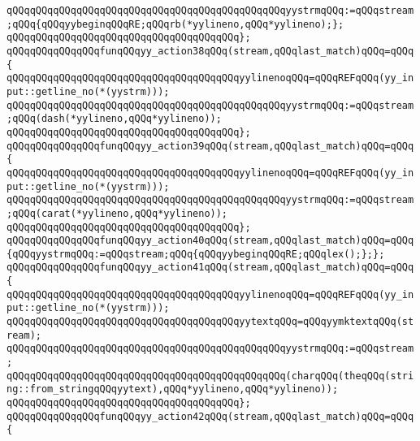 \verb|qQQqqQQqqQQqqQQqqQQqqQQqqQQqqQQqqQQqqQQqqQQqqQQqyystrmqQQq:=qQQqstream;qQQq{qQQqyybeginqQQqRE;qQQqrb(*yylineno,qQQq*yylineno);};|\newline
\verb|qQQqqQQqqQQqqQQqqQQqqQQqqQQqqQQqqQQqqQQq};|\newline
\verb|qQQqqQQqqQQqqQQqfunqQQqyy_action38qQQq(stream,qQQqlast_match)qQQq=qQQq{|\newline
\verb|qQQqqQQqqQQqqQQqqQQqqQQqqQQqqQQqqQQqqQQqyylinenoqQQq=qQQqREFqQQq(yy_input::getline_no(*(yystrm)));|\newline
\newline
\verb|qQQqqQQqqQQqqQQqqQQqqQQqqQQqqQQqqQQqqQQqqQQqqQQqyystrmqQQq:=qQQqstream;qQQq(dash(*yylineno,qQQq*yylineno));|\newline
\verb|qQQqqQQqqQQqqQQqqQQqqQQqqQQqqQQqqQQqqQQq};|\newline
\verb|qQQqqQQqqQQqqQQqfunqQQqyy_action39qQQq(stream,qQQqlast_match)qQQq=qQQq{|\newline
\verb|qQQqqQQqqQQqqQQqqQQqqQQqqQQqqQQqqQQqqQQqyylinenoqQQq=qQQqREFqQQq(yy_input::getline_no(*(yystrm)));|\newline
\newline
\verb|qQQqqQQqqQQqqQQqqQQqqQQqqQQqqQQqqQQqqQQqqQQqqQQqyystrmqQQq:=qQQqstream;qQQq(carat(*yylineno,qQQq*yylineno));|\newline
\verb|qQQqqQQqqQQqqQQqqQQqqQQqqQQqqQQqqQQqqQQq};|\newline
\verb|qQQqqQQqqQQqqQQqfunqQQqyy_action40qQQq(stream,qQQqlast_match)qQQq=qQQq{qQQqyystrmqQQq:=qQQqstream;qQQq{qQQqyybeginqQQqRE;qQQqlex();};};|\newline
\verb|qQQqqQQqqQQqqQQqfunqQQqyy_action41qQQq(stream,qQQqlast_match)qQQq=qQQq{|\newline
\verb|qQQqqQQqqQQqqQQqqQQqqQQqqQQqqQQqqQQqqQQqyylinenoqQQq=qQQqREFqQQq(yy_input::getline_no(*(yystrm)));|\newline
\verb|qQQqqQQqqQQqqQQqqQQqqQQqqQQqqQQqqQQqqQQqyytextqQQq=qQQqyymktextqQQq(stream);|\newline
\newline
\verb|qQQqqQQqqQQqqQQqqQQqqQQqqQQqqQQqqQQqqQQqqQQqqQQqyystrmqQQq:=qQQqstream;|\newline
\verb|qQQqqQQqqQQqqQQqqQQqqQQqqQQqqQQqqQQqqQQqqQQqqQQq(charqQQq(theqQQq(string::from_stringqQQqyytext),qQQq*yylineno,qQQq*yylineno));|\newline
\verb|qQQqqQQqqQQqqQQqqQQqqQQqqQQqqQQqqQQqqQQq};|\newline
\verb|qQQqqQQqqQQqqQQqfunqQQqyy_action42qQQq(stream,qQQqlast_match)qQQq=qQQq{|\newline

